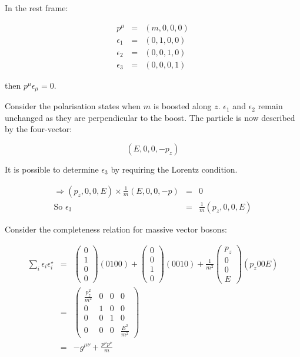 In the rest frame:

\begin{eqnarray*}
  p^{\mu}    & = & (m,0,0,0) \\
  \epsilon_1 & = & (0,1,0,0) \\
  \epsilon_2 & = & (0,0,1,0) \\
  \epsilon_3 & = & (0,0,0,1)
\end{eqnarray*}

then $p^{\mu}\epsilon_{\mu} = 0$.

Consider the polarisation states when $m$ is boosted along $z$.  $\epsilon_1$ and $\epsilon_2$ remain unchanged as they are perpendicular to the boost.  The particle is now described by the four-vector:

\[
  (E,0,0,-p_z)
\]

It is possible to determine $\epsilon_3$ by requiring the Lorentz condition.

\begin{eqnarray*}
  \Rightarrow (p_z,0,0,E)\times\frac{1}{m}(E,0,0,-p) & = & 0 \\
  \textrm{So } \epsilon_3 & = & \frac{1}{m}(p_z,0,0,E)
\end{eqnarray*}

Consider the completeness relation for massive vector bosons:

\begin{eqnarray*}
  \sum_i \epsilon_i\epsilon_i^{\star} & = &
  \left(
    \begin{array}{c}
    0 \\
    1 \\
    0 \\
    0
    \end{array}
  \right)
  (0 1 0 0)
  + 
  \left(
    \begin{array}{c}
    0 \\
    0 \\
    1 \\
    0
    \end{array}
  \right)
  (0 0 1 0)
  + \frac{1}{m^2}
  \left(
    \begin{array}{c}
    p_z \\
    0 \\
    0 \\
    E
    \end{array}
  \right)
  (p_z 0 0 E)
  \\
  & = &
  \left(
    \begin{array}{cccc}
    \frac{p_z^2}{m^2} & 0 & 0 & 0 \\
    0 & 1 & 0 & 0 \\
    0 & 0 & 1 & 0 \\
    0 & 0 & 0 & \frac{E^2}{m^2}
    \end{array}
  \right)
  \\
  & = & -g^{\mu\nu} + \frac{p^{\mu}p^{\nu}}{m}
\end{eqnarray*}

